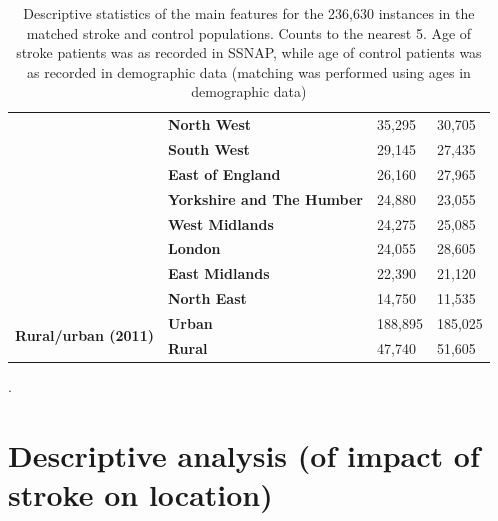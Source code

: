 \begin{table}[!ht]
\begin{tabular}{|l|l|l|l|}
        & \bf North West & 35,295 & 30,705 \\
        & \bf South West & 29,145 & 27,435 \\
        & \bf East of England & 26,160 & 27,965 \\
        & \bf Yorkshire and The Humber & 24,880 & 23,055 \\
        & \bf West Midlands & 24,275 & 25,085 \\
        & \bf London & 24,055 & 28,605 \\
        & \bf East Midlands & 22,390 & 21,120 \\
        & \bf North East & 14,750 & 11,535 \\ \hline
        \multirow{2}{*}{\bf Rural/urban (2011)} & \bf Urban & 188,895 & 185,025 \\
        & \bf Rural & 47,740 & 51,605 \\ \hline
    \end{tabular}
    \caption{Descriptive statistics of the main features for the 236,630 instances in the matched stroke and control populations. Counts to the nearest 5. Age of stroke patients was as recorded in SSNAP, while age of control patients was as recorded in demographic data (matching was performed using ages in demographic data)}.
    \label{tab:stroke_control_011}
\end{table}


\section{Descriptive analysis (of impact of stroke on location)}

